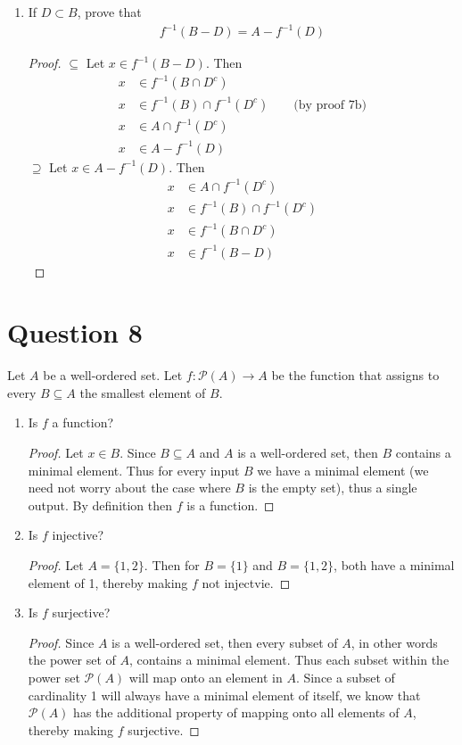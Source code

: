 \documentclass[11pt, oneside]{article}   	%
\begin{document}
\begin{enumerate}[\quad(a)]
	\item If $D\subset B$, prove that
	\begin{align*}
  		f^{-1}(B - D) = A - f^{-1}(D)
	\end{align*}
	\begin{proof}
	$\subseteq$ Let $x \in f^{-1}(B-D)$. Then
	\begin{align*}
		x & \in f^{-1}(B \cap D^c) \\
		x & \in f^{-1}(B) \cap f^{-1} (D^c) \qquad \text{(by proof 7b)}\\
		x & \in A \cap f^{-1} (D^c) \\
		x & \in A - f^{-1} (D)
	\end{align*}
	$\supseteq$ Let $x \in A - f^{-1} (D)$. Then
	\begin{align*}
		x & \in A \cap f^{-1} (D^c) \\
		x & \in f^{-1}(B) \cap f^{-1} (D^c) \\
		x & \in f^{-1}(B \cap D^c) \\
		x & \in f^{-1}(B-D)
	\end{align*}
	\end{proof}
\end{enumerate}

\section*{Question 8}

Let $A$ be a well-ordered set. Let $f:{\mathcal P}(A)\to A$ be the function that assigns to every  $B\subseteq A$ the smallest element of $B$. 
\begin{enumerate}[\quad (a)]
	\item Is $f$ a function?
	\begin{proof}
	Let $x \in B$. Since $B \subseteq A$ and $A$ is a well-ordered set, then $B$ contains a minimal element. Thus for every input $B$ we have a minimal element (we need not worry about the case where $B$ is the empty set), thus a single output. By definition then $f$ is a function. 	\end{proof}
	\item Is $f$ injective?
	\begin{proof}
		Let $A=\{1,2\}$. Then for $B=\{1\}$ and $B=\{1,2\}$, both have a minimal element of 1, thereby making $f$ not injectvie.
	\end{proof}
	\item Is $f$ surjective?
	\begin{proof}
		Since $A$ is a well-ordered set, then every subset of $A$, in other words the power set of $A$, contains a minimal element. Thus each subset within the power set $\mathcal{P}(A)$ will map onto an element in $A$. Since a subset of cardinality 1 will always have a minimal element of itself, we know that $\mathcal{P}(A)$ has the additional property of mapping onto all elements of $A$, thereby making $f$ surjective.
	\end{proof}
\end{enumerate}
\end{document}
